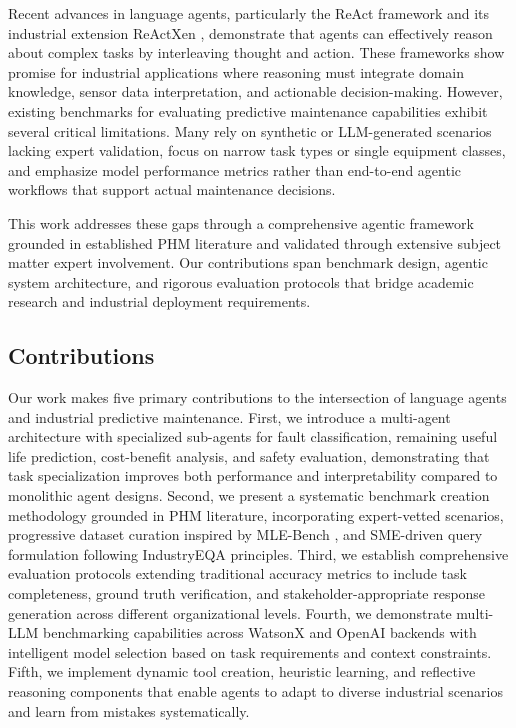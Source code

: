 \documentclass[conference]{IEEEtran}
\begin{document}
Recent advances in language agents, particularly the ReAct framework \cite{yao2023react} and its industrial extension ReActXen \cite{rayfield2025react}, demonstrate that agents can effectively reason about complex tasks by interleaving thought and action. These frameworks show promise for industrial applications where reasoning must integrate domain knowledge, sensor data interpretation, and actionable decision-making. However, existing benchmarks for evaluating predictive maintenance capabilities exhibit several critical limitations. Many rely on synthetic or LLM-generated scenarios lacking expert validation, focus on narrow task types or single equipment classes, and emphasize model performance metrics rather than end-to-end agentic workflows that support actual maintenance decisions.

This work addresses these gaps through a comprehensive agentic framework grounded in established PHM literature and validated through extensive subject matter expert involvement. Our contributions span benchmark design, agentic system architecture, and rigorous evaluation protocols that bridge academic research and industrial deployment requirements.

\subsection{Contributions}

Our work makes five primary contributions to the intersection of language agents and industrial predictive maintenance. First, we introduce a multi-agent architecture with specialized sub-agents for fault classification, remaining useful life prediction, cost-benefit analysis, and safety evaluation, demonstrating that task specialization improves both performance and interpretability compared to monolithic agent designs. Second, we present a systematic benchmark creation methodology grounded in PHM literature, incorporating expert-vetted scenarios, progressive dataset curation inspired by MLE-Bench \cite{patil2024mlebench}, and SME-driven query formulation following IndustryEQA principles. Third, we establish comprehensive evaluation protocols extending traditional accuracy metrics to include task completeness, ground truth verification, and stakeholder-appropriate response generation across different organizational levels. Fourth, we demonstrate multi-LLM benchmarking capabilities across WatsonX and OpenAI backends with intelligent model selection based on task requirements and context constraints. Fifth, we implement dynamic tool creation, heuristic learning, and reflective reasoning components that enable agents to adapt to diverse industrial scenarios and learn from mistakes systematically.
\end{document}
